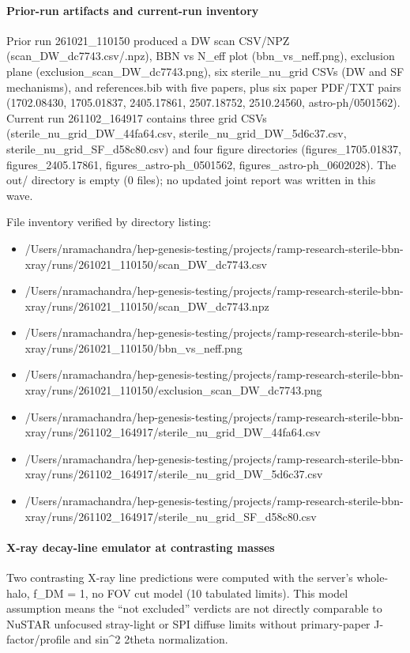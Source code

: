\documentclass[11pt,a4paper]{article}
\begin{document}
\paragraph{Prior-run artifacts and current-run inventory}
Prior run 261021\_110150 produced a DW scan CSV/NPZ (scan\_DW\_dc7743.csv/.npz), BBN vs N\_eff plot (bbn\_vs\_neff.png), exclusion plane (exclusion\_scan\_DW\_dc7743.png), six sterile\_nu\_grid CSVs (DW and SF mechanisms), and references.bib with five papers, plus six paper PDF/TXT pairs (1702.08430, 1705.01837, 2405.17861, 2507.18752, 2510.24560, astro-ph/0501562). Current run 261102\_164917 contains three grid CSVs (sterile\_nu\_grid\_DW\_44fa64.csv, sterile\_nu\_grid\_DW\_5d6c37.csv, sterile\_nu\_grid\_SF\_d58c80.csv) and four figure directories (figures\_1705.01837, figures\_2405.17861, figures\_astro-ph\_0501562, figures\_astro-ph\_0602028). The out/ directory is empty (0 files); no updated joint report was written in this wave.

File inventory verified by directory listing:

\begin{itemize}
  \item /Users/nramachandra/hep-genesis-testing/projects/ramp-research-sterile-bbn-xray/runs/261021\_110150/scan\_DW\_dc7743.csv
  \item /Users/nramachandra/hep-genesis-testing/projects/ramp-research-sterile-bbn-xray/runs/261021\_110150/scan\_DW\_dc7743.npz
  \item /Users/nramachandra/hep-genesis-testing/projects/ramp-research-sterile-bbn-xray/runs/261021\_110150/bbn\_vs\_neff.png
  \item /Users/nramachandra/hep-genesis-testing/projects/ramp-research-sterile-bbn-xray/runs/261021\_110150/exclusion\_scan\_DW\_dc7743.png
  \item /Users/nramachandra/hep-genesis-testing/projects/ramp-research-sterile-bbn-xray/runs/261102\_164917/sterile\_nu\_grid\_DW\_44fa64.csv
  \item /Users/nramachandra/hep-genesis-testing/projects/ramp-research-sterile-bbn-xray/runs/261102\_164917/sterile\_nu\_grid\_DW\_5d6c37.csv
  \item /Users/nramachandra/hep-genesis-testing/projects/ramp-research-sterile-bbn-xray/runs/261102\_164917/sterile\_nu\_grid\_SF\_d58c80.csv
\end{itemize}
\paragraph{X-ray decay-line emulator at contrasting masses}
Two contrasting X-ray line predictions were computed with the server's whole-halo, f\_DM = 1, no FOV cut model (10 tabulated limits). This model assumption means the ``not excluded'' verdicts are not directly comparable to NuSTAR unfocused stray-light or SPI diffuse limits without primary-paper J-factor/profile and sin\textasciicircum{}2 2theta normalization.
\end{document}
